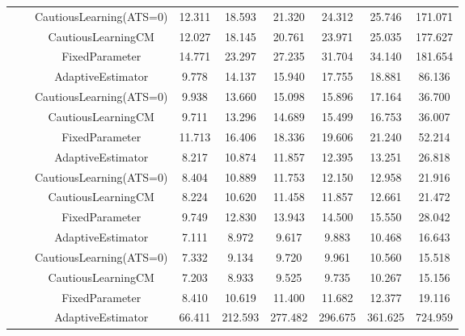 \begin{table}[!h]
\begin{tabular}[t]{ccccccccc}
 &  & CautiousLearning(ATS=0) & 12.311 & 18.593 & 21.320 & 24.312 & 25.746 & 171.071\\

 &  & CautiousLearningCM & 12.027 & 18.145 & 20.761 & 23.971 & 25.035 & 177.627\\

 & \multirow[t]{-4}{*}{\centering\arraybackslash 0.75} & FixedParameter & 14.771 & 23.297 & 27.235 & 31.704 & 34.140 & 181.654\\
\cmidrule{2-9}
 &  & AdaptiveEstimator & 9.778 & 14.137 & 15.940 & 17.755 & 18.881 & 86.136\\

 &  & CautiousLearning(ATS=0) & 9.938 & 13.660 & 15.098 & 15.896 & 17.164 & 36.700\\

 &  & CautiousLearningCM & 9.711 & 13.296 & 14.689 & 15.499 & 16.753 & 36.007\\

 & \multirow[t]{-4}{*}{\centering\arraybackslash 1.00} & FixedParameter & 11.713 & 16.406 & 18.336 & 19.606 & 21.240 & 52.214\\
\cmidrule{2-9}
 &  & AdaptiveEstimator & 8.217 & 10.874 & 11.857 & 12.395 & 13.251 & 26.818\\

 &  & CautiousLearning(ATS=0) & 8.404 & 10.889 & 11.753 & 12.150 & 12.958 & 21.916\\

 &  & CautiousLearningCM & 8.224 & 10.620 & 11.458 & 11.857 & 12.661 & 21.472\\

 & \multirow[t]{-4}{*}{\centering\arraybackslash 1.25} & FixedParameter & 9.749 & 12.830 & 13.943 & 14.500 & 15.550 & 28.042\\
\cmidrule{2-9}
 &  & AdaptiveEstimator & 7.111 & 8.972 & 9.617 & 9.883 & 10.468 & 16.643\\

 &  & CautiousLearning(ATS=0) & 7.332 & 9.134 & 9.720 & 9.961 & 10.560 & 15.518\\

 &  & CautiousLearningCM & 7.203 & 8.933 & 9.525 & 9.735 & 10.267 & 15.156\\

\multirow[t]{-28}{*}{\centering\arraybackslash 1} & \multirow[t]{-4}{*}{\centering\arraybackslash 1.50} & FixedParameter & 8.410 & 10.619 & 11.400 & 11.682 & 12.377 & 19.116\\
\cmidrule{1-9}
 &  & AdaptiveEstimator & 66.411 & 212.593 & 277.482 & 296.675 & 361.625 & 724.959\\


\end{tabular}
\end{table}
